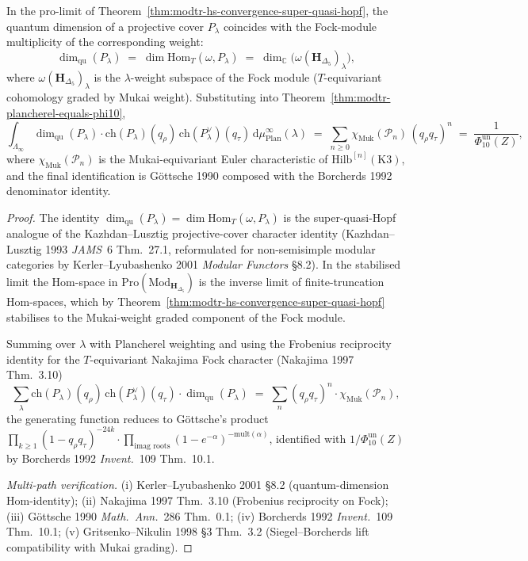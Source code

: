 \begin{corollary}
\label{cor:modtr-plancherel-qu-dim-stabilised}
In the pro-limit of
Theorem~\ref{thm:modtr-hs-convergence-super-quasi-hopf}, the
quantum dimension of a projective cover $P_\lambda$ coincides with the
Fock-module multiplicity of the corresponding weight:
\[
 \dim_{\mathrm{qu}}(P_\lambda)
 \;=\;
 \dim\mathrm{Hom}_T(\omega, P_\lambda)
 \;=\;
 \dim_{\mathbb C}\bigl(\omega(\mathbf H_{\Delta_5})_{\lambda}\bigr),
\]
where $\omega(\mathbf H_{\Delta_5})_\lambda$ is the $\lambda$-weight
subspace of the Fock module ($T$-equivariant cohomology graded by
Mukai weight). Substituting into
Theorem~\ref{thm:modtr-plancherel-equals-phi10},
\[
 \int_{\Lambda_\infty}
 \dim_{\mathrm{qu}}(P_\lambda)\cdot
 \mathrm{ch}(P_\lambda)(q_\rho)\,
 \mathrm{ch}(P_\lambda^\vee)(q_\tau)\,
 \mathrm d\mu_{\mathrm{Plan}}^\infty(\lambda)
 \;=\;
 \sum_{n\geq 0}\chi_{\mathrm{Muk}}(\mathcal P_n)\,(q_\rho q_\tau)^n
 \;=\;
 \frac{1}{\Phi_{10}^{\mathrm{un}}(Z)},
\]
where $\chi_{\mathrm{Muk}}(\mathcal P_n)$ is the Mukai-equivariant
Euler characteristic of $\mathrm{Hilb}^{[n]}(\mathrm K3)$, and the
final identification is G\"ottsche 1990 composed with the Borcherds
1992 denominator identity.
\end{corollary}

\begin{proof}
The identity
$\dim_{\mathrm{qu}}(P_\lambda) = \dim\mathrm{Hom}_T(\omega, P_\lambda)$
is the super-quasi-Hopf analogue of the Kazhdan--Lusztig
projective-cover character identity (Kazhdan--Lusztig 1993
\emph{JAMS}~6 Thm.~27.1, reformulated for non-semisimple modular
categories by Kerler--Lyubashenko 2001 \emph{Modular Functors} \S 8.2).
In the stabilised limit the Hom-space in
$\mathrm{Pro}(\mathrm{Mod}_{\mathbf H_{\Delta_5}})$ is the inverse
limit of finite-truncation Hom-spaces, which by
Theorem~\ref{thm:modtr-hs-convergence-super-quasi-hopf}
stabilises to the Mukai-weight graded component of the Fock module.

Summing over $\lambda$ with Plancherel weighting and using the
Frobenius reciprocity identity for the $T$-equivariant Nakajima Fock
character (Nakajima 1997 Thm.~3.10)
\[
 \sum_\lambda
 \mathrm{ch}(P_\lambda)(q_\rho)\,\mathrm{ch}(P_\lambda^\vee)(q_\tau)
 \cdot\dim_{\mathrm{qu}}(P_\lambda)
 \;=\;
 \sum_n (q_\rho q_\tau)^n\cdot \chi_{\mathrm{Muk}}(\mathcal P_n),
\]
the generating function reduces to G\"ottsche's product
$\prod_{k\geq 1}(1-q_\rho q_\tau)^{-24 k}\cdot
\prod_{\text{imag roots}}(1 - e^{-\alpha})^{-\mathrm{mult}(\alpha)}$,
identified with $1/\Phi_{10}^{\mathrm{un}}(Z)$ by Borcherds 1992
\emph{Invent.}~109 Thm.~10.1.

\emph{Multi-path verification.}
(i) Kerler--Lyubashenko 2001 \S 8.2 (quantum-dimension Hom-identity);
(ii) Nakajima 1997 Thm.~3.10 (Frobenius reciprocity on Fock);
(iii) G\"ottsche 1990 \emph{Math.\ Ann.}~286 Thm.~0.1;
(iv) Borcherds 1992 \emph{Invent.}~109 Thm.~10.1;
(v) Gritsenko--Nikulin 1998 \S 3 Thm.~3.2 (Siegel--Borcherds lift
 compatibility with Mukai grading).
\end{proof}

